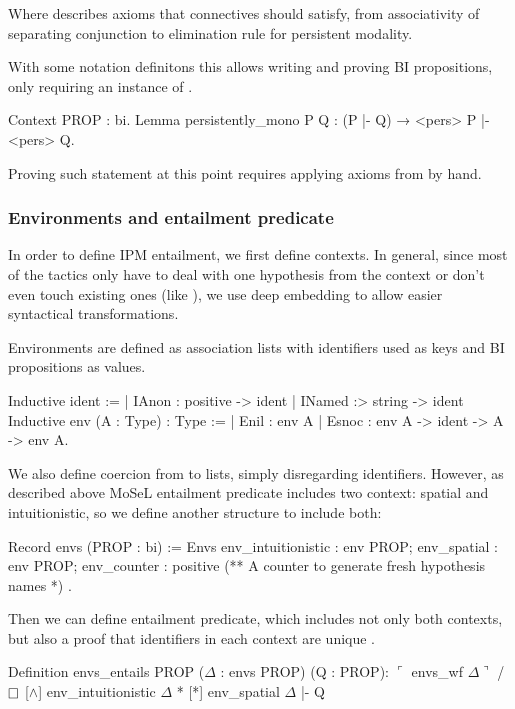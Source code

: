 Where  describes axioms that connectives should satisfy, from associativity of separating conjunction to elimination rule for persistent modality.

With some notation definitons this allows writing and proving BI propositions, only requiring an instance of .

\begin{minipage}{\linewidth}
\begin{coq}
Context {PROP : bi}.
Lemma persistently_mono P Q : (P |- Q) → <pers> P |- <pers> Q.
\end{coq}
\end{minipage}

Proving such statement at this point requires applying axioms from  by hand.

\subsubsection{Environments and entailment predicate}
\label{subsubsec:environment-entailment-pred}

In order to define IPM entailment, we first define contexts.
In general, since most of the tactics only have to deal with one hypothesis from the context or don't even touch existing ones (like ), we use deep embedding to allow easier syntactical transformations.

Environments are defined as association lists with identifiers used as keys and BI propositions as values.

\begin{coq}
Inductive ident :=
  | IAnon : positive -> ident
  | INamed :> string -> ident
Inductive env (A : Type) : Type :=
  | Enil : env A
  | Esnoc : env A -> ident -> A -> env A.
\end{coq}

We also define coercion from  to lists, simply disregarding identifiers.
However, as described above MoSeL entailment predicate includes two context: spatial and intuitionistic, so we define another structure to include both:

\begin{coq}
Record envs (PROP : bi) := Envs {
  env_intuitionistic : env PROP;
  env_spatial : env PROP;
  env_counter : positive (** A counter to generate fresh hypothesis names *)
}.
\end{coq}

Then we can define entailment predicate, which includes not only both contexts, but also a proof that identifiers in each context are unique .
\begin{coq}
  Definition envs_entails {PROP} ($\Delta$ : envs PROP) (Q : PROP):
  $\ulcorner$ envs_wf $\Delta \urcorner$ /\ $\mathop{\Box}$ [$\wedge$] env_intuitionistic $\Delta$ * [*] env_spatial $\Delta$ |- Q
\end{coq}

